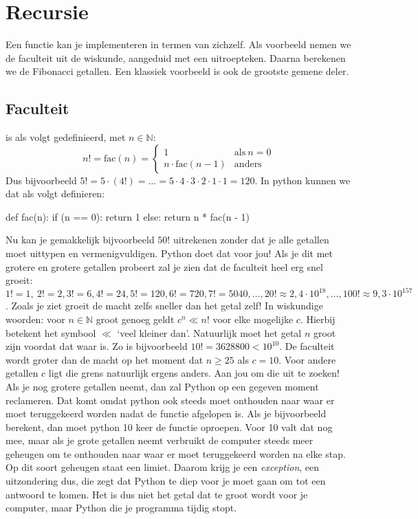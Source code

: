 \section{Recursie}
  Een functie kan je implementeren in termen van zichzelf. Als voorbeeld nemen
  we de faculteit uit de wiskunde, aangeduid met een uitroepteken. Daarna
  berekenen we de Fibonacci getallen. Een klassiek voorbeeld is ook de grootste
  gemene deler.
  \subsection{Faculteit} is als volgt gedefinieerd, met $n \in \mathbb{N}$:
  \begin{equation*}
    n! = \text{fac}\left(n\right) =
    \begin{cases}
      1                                & \text{als}\ n = 0 \\
      n\cdot\text{fac}\left(n-1\right) & \text{anders}
    \end{cases}
  \end{equation*}
  Dus bijvoorbeeld
  $5!=5\cdot(4!)= \ldots = 5\cdot4\cdot3\cdot2\cdot1\cdot1 = 120$. In python
  kunnen we dat als volgt definieren:
  \begin{python}
    def fac(n):
      if (n == 0): return 1
      else: return n * fac(n - 1)
  \end{python}
  Nu kan je gemakkelijk bijvoorbeeld $50!$ uitrekenen zonder dat je alle
  getallen moet uittypen en vermenigvuldigen. Python doet dat voor jou! Als je
  dit met grotere en grotere getallen probeert zal je zien dat de faculteit heel
  erg snel groeit: $1!=1,\ 2!=2, 3!=6, 4!=24, 5!=120, 6!=720, 7!=5040, \ldots, 20!
  \approx 2,4\cdot10^{18}, \ldots, 100! \approx 9,3\cdot10^{157}$. Zoals je ziet
  groeit de macht zelfs sneller dan het getal zelf! In wiskundige woorden:
  voor $n \in \mathbb{N}$ groot genoeg geldt $c^n\ll n!$ voor elke mogelijke
  $c$. Hierbij betekent het symbool $\ll$ `veel kleiner dan'. Natuurlijk moet
  het getal $n$ groot zijn voordat dat waar is. Zo is bijvoorbeeld $10! =
  3628800 < 10^{10}$. De faculteit wordt groter dan de macht op het moment dat
  $n \geq 25$ als $c = 10$. Voor andere getallen $c$ ligt die grens natuurlijk
  ergens anders. Aan jou om die uit te zoeken!
  \\[1em]
  Als je nog grotere getallen neemt, dan zal Python op een gegeven moment
  reclameren. Dat komt omdat python ook steeds moet onthouden naar waar er moet
  teruggekeerd worden nadat de functie afgelopen is. Als je bijvoorbeeld
   berekent, dan moet python 10 keer de functie  oproepen.
  Voor 10 valt dat nog mee, maar als je grote getallen neemt verbruikt de
  computer steeds meer geheugen om te onthouden naar waar er moet teruggekeerd
  worden na elke stap. Op dit soort geheugen staat een limiet. Daarom krijg je
  een \emph{exception}, een uitzondering dus, die zegt dat Python te diep voor
  je moet gaan om tot een antwoord te komen. Het is dus niet het getal dat te
  groot wordt voor je computer, maar Python die je programma tijdig stopt.

